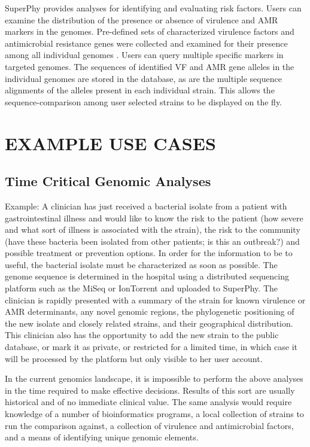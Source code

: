 \documentclass[a4paper,twoside]{article}
\begin{document}
SuperPhy provides analyses for identifying and evaluating risk factors. Users can examine the distribution of the presence or absence of virulence and AMR markers in the genomes.  Pre-defined sets of characterized virulence factors and antimicrobial resistance genes were collected and examined for their presence among all individual genomes \cite{mcarthur2012card,chen2012vfdb,chen2005vfdb}. Users can query multiple specific markers in targeted genomes. The sequences of identified VF and AMR gene alleles in the individual genomes are stored in the database, as are the multiple sequence alignments of the alleles present in each individual strain. This allows the sequence-comparison among user selected strains to be displayed on the fly. 

\section{\uppercase{Example Use Cases}}
\label{sec:cases}
\subsection{Time Critical Genomic Analyses}
Example: A clinician has just received a bacterial isolate from a patient with gastrointestinal illness and would like to know the risk to the patient (how severe and what sort of illness is associated with the strain), the risk to the community (have these bacteria been isolated from other patients; is this an outbreak?) and possible treatment or prevention options. In order for the information to be to useful, the bacterial isolate must be characterized as soon as possible. The genome sequence is determined in the hospital using a distributed sequencing platform such as the MiSeq or IonTorrent and uploaded to SuperPhy. The clinician is rapidly presented with a summary of the strain for known virulence or AMR determinants, any novel genomic regions, the phylogenetic positioning of the new isolate and closely related strains, and their geographical distribution. This clinician also has the opportunity to add the new strain to the public database, or mark it as private, or restricted for a limited time, in which case it will be processed by the platform but only visible to her user account.

In the current genomics landscape, it is impossible to perform the above analyses in the time required to make effective decisions. Results of this sort are usually historical and of no immediate clinical value. The same analysis would require knowledge of a number of bioinformatics programs, a local collection of strains to run the comparison against, a collection of virulence and antimicrobial factors, and a means of identifying unique genomic elements.
\end{document}
